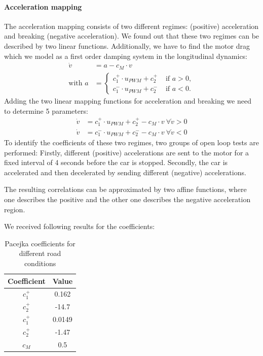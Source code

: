 \paragraph{Acceleration mapping} The acceleration mapping consists of two different regimes: (positive) acceleration and breaking (negative acceleration). We found out that these two regimes can be described by two linear functions. Additionally, we have to find the motor drag which we model as a first order damping system in the longitudinal dynamics:
\begin{align}
\dot v &= a - c_M\cdot v\\
\text{with } a&=\begin{cases}
c_{1}^+\cdot u_{PWM}+c_{2}^+ &\text{ if } a>0,\\
c_{1}^-\cdot u_{PWM}+c_{2}^- &\text{ if } a<0.
\end{cases}
\end{align}
Adding the two linear mapping functions for acceleration and breaking we need to determine 5 parameters:
\begin{align}
\dot v &= c_{1}^+\cdot u_{PWM}+c_{2}^+ - c_M\cdot v\ \forall \dot v > 0\\
\dot v &= c_{1}^-\cdot u_{PWM}+c_{2}^- - c_M\cdot v\ \forall \dot v < 0
\end{align}
To identify the coefficients of these two regimes, two groups of open loop tests are performed: Firstly, different (positive) accelerations are sent to the motor for a fixed interval of 4 seconds before the car is stopped. Secondly, the car is accelerated and then decelerated by sending different (negative) accelerations.

The resulting correlations can be approximated by two affine functions, where one describes the positive and the other one describes the negative acceleration region.

We received following results for the coefficients:
\begin{table}[h!]
\centering
\begin{tabular}{c|c}
Coefficient & Value\\
\hline
$c_1^+$ & 0.162\\
$c_2^+$ & -14.7\\
$c_1^+$ & 0.0149\\
$c_2^+$ & -1.47\\
$c_M$ & 0.5
\end{tabular}
\caption{Pacejka coefficients for different road conditions}
\label{tab:v_mapping}
\end{table}


